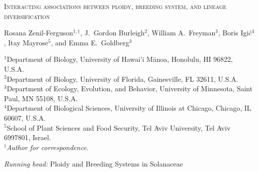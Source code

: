 \documentclass[11pt]{article}
\begin{document}

%
%
%
%
%
%
%
%
\begin{center}
    \textsc{Interacting associations between ploidy, breeding system, and lineage diversification}

\vfill

\noindent 
Rosana Zenil-Ferguson$^{1,\dagger}$,
%
J.~Gordon Burleigh$^{2}$,
%
William A.~Freyman$^{3}$,
%
Boris Igi\'c$^{4}$,
%
Itay Mayrose$^{5}$,
%
and Emma E.~Goldberg$^{3}$
%
\end{center}
%
\noindent$^{1}$Department of Biology, University of Hawai'i M\={a}noa, Honolulu, HI 96822, U.S.A.\\
%
\noindent$^{2}$Department of Biology, University of Florida, Gainesville, FL 32611, U.S.A.\\
%
\noindent$^{3}$Department of Ecology, Evolution, and Behavior, University of Minnesota, Saint Paul, MN 55108, U.S.A.\\
%
\noindent$^{4}$Department of Biological Sciences, University of Illinois at Chicago, Chicago, IL 60607, U.S.A. \\
%
\noindent$^{5}$School of Plant Sciences and Food Security, Tel Aviv University, Tel Aviv 6997801, Israel.\\
%
\noindent$^\dagger$\textit{Author for correspondence}.\\

\vfill

\noindent\textit{Running head:} 
Ploidy and Breeding Systems in Solanaceae
\end{document}
